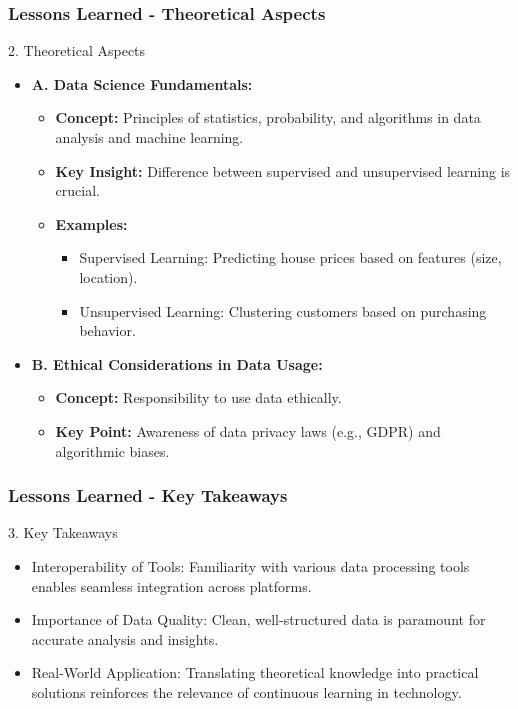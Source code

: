 \documentclass[aspectratio=169]{beamer}
\begin{document}
\begin{frame}[fragile]
    \frametitle{Lessons Learned - Theoretical Aspects}
    \begin{block}{2. Theoretical Aspects}
        \begin{itemize}
            \item \textbf{A. Data Science Fundamentals:}
                \begin{itemize}
                    \item \textbf{Concept:} Principles of statistics, probability, and algorithms in data analysis and machine learning.
                    \item \textbf{Key Insight:} Difference between supervised and unsupervised learning is crucial.
                \end{itemize}
                \begin{itemize}
                    \item \textbf{Examples:}
                    \begin{itemize}
                        \item Supervised Learning: Predicting house prices based on features (size, location).
                        \item Unsupervised Learning: Clustering customers based on purchasing behavior.
                    \end{itemize}
                \end{itemize}
            \item \textbf{B. Ethical Considerations in Data Usage:}
                \begin{itemize}
                    \item \textbf{Concept:} Responsibility to use data ethically.
                    \item \textbf{Key Point:} Awareness of data privacy laws (e.g., GDPR) and algorithmic biases.
                \end{itemize}
        \end{itemize}
    \end{block}
\end{frame}

\begin{frame}[fragile]
    \frametitle{Lessons Learned - Key Takeaways}
    \begin{block}{3. Key Takeaways}
        \begin{itemize}
            \item Interoperability of Tools: Familiarity with various data processing tools enables seamless integration across platforms.
            \item Importance of Data Quality: Clean, well-structured data is paramount for accurate analysis and insights.
            \item Real-World Application: Translating theoretical knowledge into practical solutions reinforces the relevance of continuous learning in technology.
        \end{itemize}
    \end{block}
\end{frame}
\end{document}
